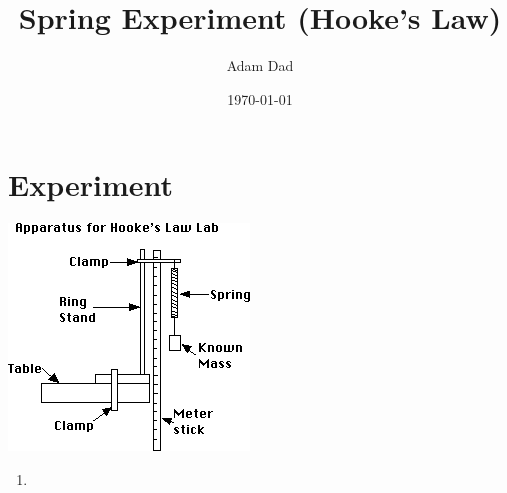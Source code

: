 \documentclass[a4paper]{article}
\title{Spring Experiment (Hooke's Law)}
\author{Adam Dad}
\date{\today}
\begin{document}
\maketitle

\section*{Experiment}
\begin{center}
\includegraphics[scale=1.0]{fig1.png}\\
\end{center}

\begin{enumerate}[label=(\alph*)]
\item 

\end{enumerate}
\end{document}
